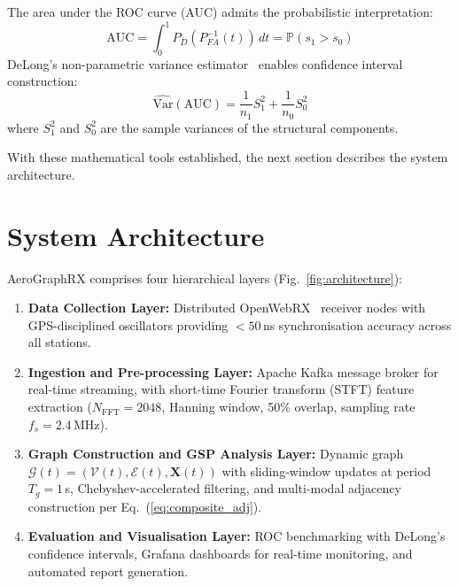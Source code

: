 \documentclass[sensors,article,submit,pdftex]{mdpi}
\newcommand{\mat}[1]{\mathbf{#1}}
\newcommand{\Prob}{\mathbb{P}}
\begin{document}
The area under the ROC curve (AUC) admits the probabilistic interpretation:
\begin{equation}
    \text{AUC} = \int_0^1 P_D(P_{FA}^{-1}(t))\, dt = \Prob(s_1 > s_0)
    \label{eq:auc}
\end{equation}
DeLong's non-parametric variance estimator~\cite{fawcett2006} enables confidence interval construction:
\begin{equation}
    \widehat{\text{Var}}(\text{AUC}) = \frac{1}{n_1} S_1^2 + \frac{1}{n_0} S_0^2
    \label{eq:auc_var}
\end{equation}
where $S_1^2$ and $S_0^2$ are the sample variances of the structural components.

With these mathematical tools established, the next section describes the system architecture.

\section{System Architecture}
\label{sec:architecture}

AeroGraphRX comprises four hierarchical layers (Fig.~\ref{fig:architecture}):

\begin{enumerate}[nosep,leftmargin=*]
    \item \textbf{Data Collection Layer:} Distributed OpenWebRX~\cite{openwebrx} receiver nodes with GPS-disciplined oscillators providing $< 50$\,ns synchronisation accuracy across all stations.
    \item \textbf{Ingestion and Pre-processing Layer:} Apache Kafka message broker for real-time streaming, with short-time Fourier transform (STFT) feature extraction ($N_{\text{FFT}} = 2048$, Hanning window, 50\% overlap, sampling rate $f_s = 2.4$\,MHz).
    \item \textbf{Graph Construction and GSP Analysis Layer:} Dynamic graph $\mathcal{G}(t) = (\mathcal{V}(t), \mathcal{E}(t), \mat{X}(t))$ with sliding-window updates at period $T_g = 1$\,s, Chebyshev-accelerated filtering, and multi-modal adjacency construction per Eq.~(\ref{eq:composite_adj}).
    \item \textbf{Evaluation and Visualisation Layer:} ROC benchmarking with DeLong's confidence intervals, Grafana dashboards for real-time monitoring, and automated report generation.
\end{enumerate}
\end{document}
